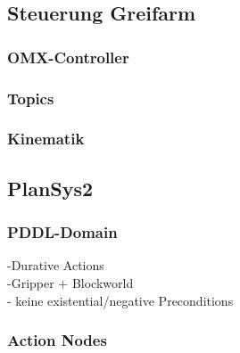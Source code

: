 \subsection{Steuerung Greifarm}
\subsubsection{OMX-Controller}
\subsubsection{Topics}
\subsubsection{Kinematik}
\subsection{PlanSys2}
\cite{plansys}
\subsubsection{PDDL-Domain}
-Durative Actions\\
-Gripper + Blockworld\\
- keine existential/negative Preconditions\\
\subsubsection{Action Nodes}

